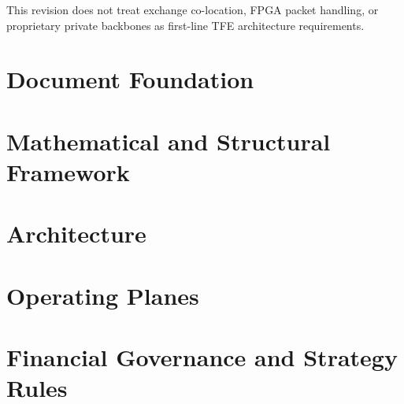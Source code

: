 \documentclass[11pt]{report}
\begin{document}
This revision does not treat exchange co-location, FPGA packet handling, or proprietary private backbones as first-line TFE architecture requirements.

\clearpage

\part{Document Foundation}





\part{Mathematical and Structural Framework}





\part{Architecture}






\part{Operating Planes}










\part{Financial Governance and Strategy Rules}
\end{document}
